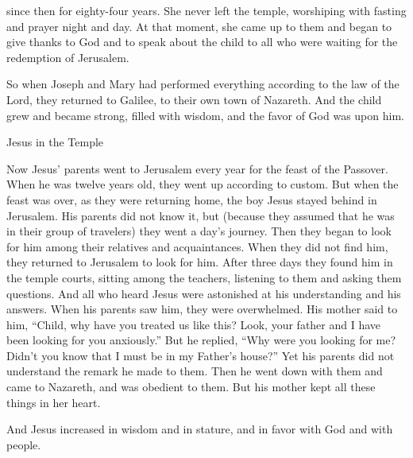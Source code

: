 {since
then for eighty-four
years.
She
never
left
the temple,
worshiping
with fasting
and
prayer
night
and
day.
At that moment,
she came up
to them and began to give thanks
to God
and
to speak
about
the child
to all
who were waiting
for
the redemption
of Jerusalem.
\par }{\PP {}So
when
Joseph and Mary had performed
everything
according to
the law
of the Lord,
they returned
to
Galilee,
to
their own
town
of Nazareth.
And
the child
grew
and
became strong,
filled
with wisdom,
and
the favor
of God
was
upon
him.
\par }{\SH Jesus in the Temple
\par }{\PP {}Now
Jesus’
parents
went to
Jerusalem
every
year
for
the feast
of the Passover.
When
he was
twelve
years old,
they
went up
according to
custom.
But
when
the feast was over,
as they
were returning home,
the boy
Jesus
stayed behind
in
Jerusalem.
His
parents
did
not
know it,
but
(because they assumed
that he
was
in
their group of travelers) they went
a day’s
journey.
Then
they began to look for
him
among
their relatives
and
acquaintances.
When
they did
not
find
him, they returned
to
Jerusalem
to look for
him.
After
three
days
they found
him
in
the temple courts,
sitting
among
the teachers,
listening
to them
and
asking
them
questions.
And
all
who heard
Jesus
were astonished
at
his understanding
and
his
answers.
When
his parents saw
him,
they were overwhelmed.
His
mother
said
to
him,
“Child,
why
have you treated
us
like this? Look,
your
father
and
I
have been looking for
you
anxiously.”
But
he replied, “Why
were you looking for
me? Didn’t
you know
that
I
must
be
in
my
Father’s house?”
Yet
his parents
did
not
understand
the remark
he made
to them.
Then
he went down
with
them
and
came
to
Nazareth,
and
was
obedient
to them.
But
his
mother
kept
all
these things
in
her
heart.
\par }{\PP {}And
Jesus
increased
in wisdom
and
in stature,
and
in favor
with
God
and
with people.

}
